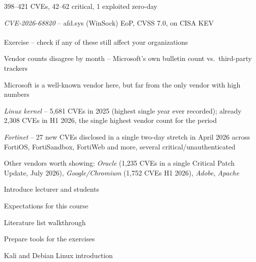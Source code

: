 \documentclass[Screen16to9,17pt]{foils}
\begin{document}
\begin{list2}
\item 398--421 CVEs, 42--62 critical, 1 exploited zero-day
\item \emph{CVE-2026-68820} -- afd.sys (WinSock) EoP, CVSS 7.0, on CISA KEV\\
\\
Exercise -- check if any of these still affect your organizations
\item Vendor counts disagree by month -- Microsoft's own bulletin count vs.\ third-party trackers
\end{list2}

\begin{list2}
\item Microsoft is a well-known vendor here, but far from the only vendor with high numbers
\item \emph{Linux kernel} -- 5{,}681 CVEs in 2025 (highest single year ever recorded); already 2{,}308 CVEs in H1 2026, the single highest vendor count for the period\\
\item \emph{Fortinet} -- 27 new CVEs disclosed in a single two-day stretch in April 2026 across FortiOS, FortiSandbox, FortiWeb and more, several critical/unauthenticated\\
\item Other vendors worth showing: \emph{Oracle} (1{,}235 CVEs in a single Critical Patch Update, July 2026), \emph{Google/Chromium} (1{,}752 CVEs H1 2026), \emph{Adobe}, \emph{Apache}
\end{list2}


\begin{list2}
\item Introduce lecturer and students
\item Expectations for this course
\item Literature list walkthrough
\item Prepare tools for the exercises
\item Kali and Debian Linux introduction
\end{list2}
\end{document}
